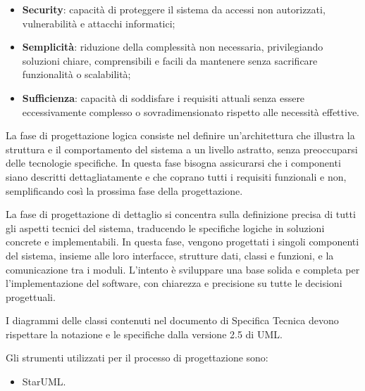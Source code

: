 \begin{itemize}
    \item \textbf{Security}: capacità di proteggere il sistema da accessi non autorizzati, vulnerabilità e attacchi informatici;
    \item \textbf{Semplicità}: riduzione della complessità non necessaria, privilegiando soluzioni chiare, comprensibili e facili da mantenere senza sacrificare funzionalità o scalabilità;
    \item \textbf{Sufficienza}: capacità di soddisfare i requisiti attuali senza essere eccessivamente complesso o sovradimensionato rispetto alle necessità effettive.
\end{itemize}

La fase di progettazione logica consiste nel definire un'architettura che illustra la struttura e il comportamento del sistema a un livello astratto, senza preoccuparsi delle tecnologie specifiche. In questa fase bisogna assicurarsi che i componenti siano descritti dettagliatamente e che coprano tutti i requisiti funzionali e non, semplificando così la prossima fase della progettazione.

La fase di progettazione di dettaglio si concentra sulla definizione precisa di tutti gli aspetti tecnici del sistema, traducendo le specifiche logiche in soluzioni concrete e implementabili. In questa fase, vengono progettati i singoli componenti del sistema, insieme alle loro interfacce, strutture dati, classi e funzioni, e la comunicazione tra i moduli. L'intento è sviluppare una base solida e completa per l'implementazione del software, con chiarezza e precisione su tutte le decisioni progettuali.

I diagrammi delle classi contenuti nel documento di Specifica Tecnica devono rispettare la notazione e le specifiche dalla versione 2.5 di UML.

Gli strumenti utilizzati per il processo di progettazione sono:
\begin{itemize}
    \item StarUML.
\end{itemize}

